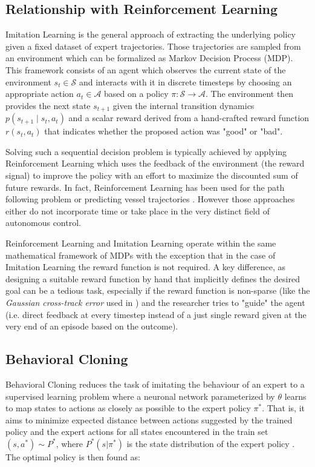 \documentclass[conference]{IEEEtran}
\begin{document}
\subsection{Relationship with Reinforcement Learning}
Imitation Learning is the general approach of extracting the underlying policy given a fixed dataset of expert trajectories. Those trajectories are sampled from an environment which can be  formalized as Markov Decision Process (MDP). This framework consists of an agent which observes the current state of the environment $s_t \in \mathcal{S}$ and interacts with it in discrete timesteps by choosing an appropriate action $a_t \in \mathcal{A}$ based on a policy $\pi: \mathcal{S} \rightarrow \mathcal{A}$. The environment then provides the next state $s_{t+1}$ given the internal transition dynamics $p(s_{t+1} \mid s_t, a_t)$  and a scalar reward derived from a hand-crafted reward function $r(s_t, a_t)$ that indicates whether the proposed action was "good" or "bad".
\par
Solving such a sequential decision problem is typically achieved by applying Reinforcement Learning which uses the feedback of the environment (the reward signal) to improve the policy with an effort to maximize the discounted sum of future rewards. In fact, Reinforcement Learning has been used for the path following problem \cite{martinsen2018curved} or predicting vessel trajectories \cite{etemad2020using, zare2021continuous, s20020426}. However those approaches either do not incorporate time or take place in the very distinct field of autonomous control. 
\par
Reinforcement Learning and Imitation Learning operate within the same mathematical framework of MDPs with the exception that in the case of Imitation Learning the reward function is not required. A key difference, as designing a suitable reward function by hand that implicitly defines the desired goal can be a tedious task, especially if the reward function is non-sparse (like the \textit{Gaussian cross-track error} used in \cite{martinsen2018curved}) and the researcher tries to "guide" the agent (i.e. direct feedback at every timestep instead of a just single reward given at the very end of an episode based on the outcome).

\subsection{Behavioral Cloning}
Behavioral Cloning\cite{alvinn} reduces the task of imitating the behaviour of an expert to a supervised learning problem where a neuronal network parameterized by $\theta$ learns to map states to actions as closely as possible to the expert policy $\pi^*$. That is, it aims to minimize expected distance between actions suggested by the trained policy and the expert actions for all states encountered in the train set $(s, a^*) \sim P^*$, where $P^*(s|\pi^*)$ is the state distribution of the expert policy \cite{le2022survey}. The optimal policy is then found as:
\end{document}
